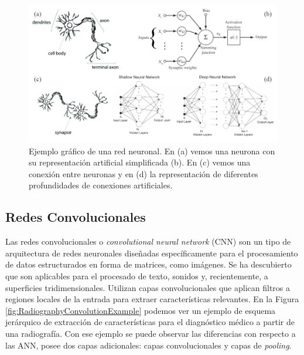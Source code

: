 \begin{figure}[htp]
  \centering
  \includegraphics[width=\textwidth]{imagenes/chapter2/ANNVisualization.png}
  \caption[Ejemplo gráfico de una red neuronal\cite{NeuronImages, NeuronSimilarity,ShallowAndDeepNN}.]
  {Ejemplo gráfico de una red neuronal\cite{NeuronImages, NeuronSimilarity,ShallowAndDeepNN}. 
      En (a) vemos una neurona con su representación artificial simplificada (b). En (c) vemos una conexión entre 
  neuronas y en (d) la representación de diferentes profundidades de conexiones artificiales.}
  \label{fig:ANNVisualization}
\end{figure}

\subsection{Redes Convolucionales} 
Las redes convolucionales o \emph{convolutional neural network} (CNN)\cite{ConvolutionalZipCode, ConvolutionInRadiology}
son un tipo de arquitectura de redes neuronales diseñadas 
específicamente para el procesamiento de datos estructurados en forma de matrices, como imágenes.
Se ha descubierto que son aplicables para el procesado de texto, sonidos y, recientemente,
a superficies tridimensionales.
Utilizan capas convolucionales que aplican filtros a regiones locales de la entrada 
para extraer características relevantes. En la Figura \ref{fig:RadiographyConvolutionExample}
podemos ver un ejemplo de esquema jerárquico de extracción de características para el 
diagnóstico médico a partir de una radiografía. Con ese ejemplo se puede observar 
las diferencias con respecto a las ANN, posee dos capas adicionales: capas convolucionales 
y capas de \emph{pooling}.

